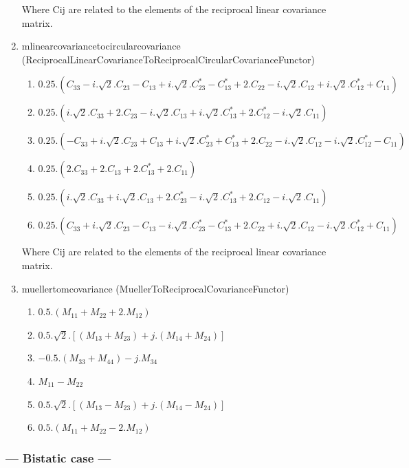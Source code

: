 \begin{enumerate}
Where Cij are related to the elements of the reciprocal linear covariance matrix.
 
\item mlinearcovariancetocircularcovariance (ReciprocalLinearCovarianceToReciprocalCircularCovarianceFunctor)
\begin{enumerate}
\item $ 0.25 . ( C_{33}-i.\sqrt{2}.C_{23}-C_{13}+i.\sqrt{2}.C_{23}^{*}-C_{13}^{*}+2.C_{22}-i.\sqrt{2}.C_{12}+i.\sqrt{2}.C_{12}^{*}+C_{11} ) $ 
\item $ 0.25 . ( i.\sqrt{2}.C_{33}+2.C_{23}-i.\sqrt{2}.C_{13}+i.\sqrt{2}.C_{13}^{*}+2.C_{12}^{*}-i.\sqrt{2}.C_{11} ) $ 
\item $ 0.25 . ( -C_{33}+i.\sqrt{2}.C_{23}+C_{13}+i.\sqrt{2}.C_{23}^{*}+C_{13}^{*}+2.C_{22}-i.\sqrt{2}.C_{12}-i.\sqrt{2}.C_{12}^{*}-C_{11} ) $ 
\item $ 0.25 . ( 2.C_{33}+2.C_{13}+2.C_{13}^{*}+2.C_{11} ) $ 
\item $ 0.25 . ( i.\sqrt{2}.C_{33}+i.\sqrt{2}.C_{13}+2.C_{23}^{*}-i.\sqrt{2}.C_{13}^{*}+2.C_{12}-i.\sqrt{2}.C_{11} ) $ 
\item $ 0.25 . ( C_{33}+i.\sqrt{2}.C_{23}-C_{13}-i.\sqrt{2}.C_{23}^{*}-C_{13}^{*}+2.C_{22}+i.\sqrt{2}.C_{12}-i.\sqrt{2}.C_{12}^{*}+C_{11} ) $
\end{enumerate}

Where Cij are related to the elements of the reciprocal linear covariance matrix.

\item muellertomcovariance (MuellerToReciprocalCovarianceFunctor)
\begin{enumerate}
\item $ 0.5.(M_{11}+M_{22}+2.M_{12}) $ 
\item $ 0.5.\sqrt{2}.[(M_{13}+M_{23}) + j.(M_{14}+M_{24})] $ 
\item $ -0.5.(M_{33}+M_{44}) - j.M_{34} $ 
\item $ M_{11}-M_{22} $ 
\item $ 0.5.\sqrt{2}.[(M_{13}-M_{23}) + j.(M_{14}-M_{24})] $ 
\item $ 0.5.(M_{11}+M_{22}-2.M_{12}) $
\end{enumerate}

\end{enumerate}

\subsubsection{--- Bistatic case ---}

